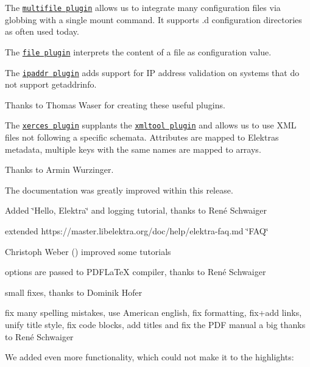 The \href{https://www.libelektra.org/plugins/multifile}{\tt multifile plugin} allows us to integrate many configuration files via globbing with a single mount command. It supports {\ttfamily .d} configuration directories as often used today.

The \href{https://www.libelektra.org/plugins/file}{\tt file plugin} interprets the content of a file as configuration value.

The \href{https://www.libelektra.org/plugins/ipaddr}{\tt ipaddr plugin} adds support for IP address validation on systems that do not support {\ttfamily getaddrinfo}.

Thanks to Thomas Waser for creating these useful plugins.

The \href{https://www.libelektra.org/plugins/xerces}{\tt xerces plugin} supplants the \href{https://www.libelektra.org/plugins/xmltool}{\tt xmltool plugin} and allows us to use X\+ML files not following a specific schemata. Attributes are mapped to Elektra\textquotesingle{}s metadata, multiple keys with the same names are mapped to arrays.

Thanks to Armin Wurzinger.

The documentation was greatly improved within this release.


\begin{DoxyItemize}
\item Added \char`\"{}\+Hello, Elektra\char`\"{} and logging tutorial, thanks to René Schwaiger
\item extended https\+://master.libelektra.\+org/doc/help/elektra-\/faq.md \char`\"{}\+F\+A\+Q\char`\"{}
\item Christoph Weber () improved some tutorials
\item options are passed to P\+D\+F\+La\+TeX compiler, thanks to René Schwaiger
\item small fixes, thanks to Dominik Hofer
\item fix many spelling mistakes, use American english, fix formatting, fix+add links, unify title style, fix code blocks, add titles and fix the P\+DF manual a big thanks to René Schwaiger
\end{DoxyItemize}

We added even more functionality, which could not make it to the highlights\+:


